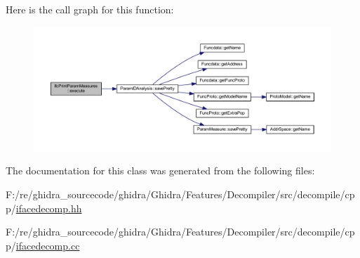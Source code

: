 Here is the call graph for this function\+:
\nopagebreak
\begin{figure}[H]
\begin{center}
\leavevmode
\includegraphics[width=350pt]{class_ifc_print_param_measures_a85f768a0cc5ac73b3feb42d46089ebce_cgraph}
\end{center}
\end{figure}


The documentation for this class was generated from the following files\+:\begin{DoxyCompactItemize}
\item 
F\+:/re/ghidra\+\_\+sourcecode/ghidra/\+Ghidra/\+Features/\+Decompiler/src/decompile/cpp/\mbox{\hyperlink{ifacedecomp_8hh}{ifacedecomp.\+hh}}\item 
F\+:/re/ghidra\+\_\+sourcecode/ghidra/\+Ghidra/\+Features/\+Decompiler/src/decompile/cpp/\mbox{\hyperlink{ifacedecomp_8cc}{ifacedecomp.\+cc}}\end{DoxyCompactItemize}
